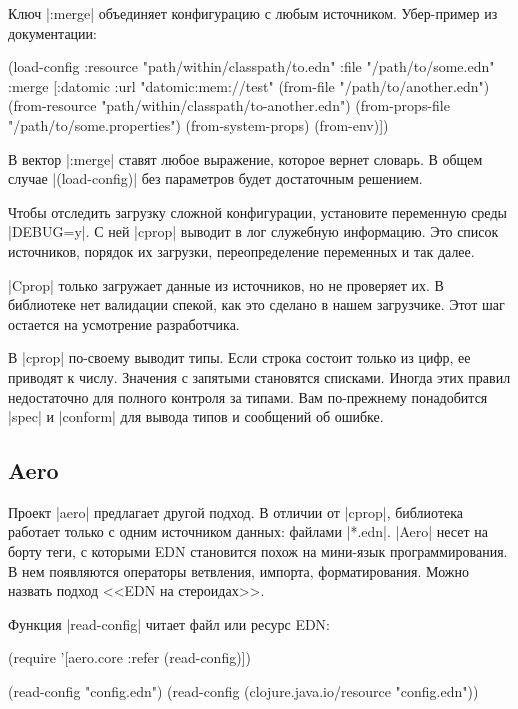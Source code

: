 Ключ \spverb|:merge| объединяет конфигурацию с любым источником. Убер-пример из
документации:

\begin{english}
  \begin{clojure}
(load-config
 :resource "path/within/classpath/to.edn"
 :file "/path/to/some.edn"
 :merge [{:datomic {:url "datomic:mem://test"}}
         (from-file "/path/to/another.edn")
         (from-resource "path/within/classpath/to-another.edn")
         (from-props-file "/path/to/some.properties")
         (from-system-props)
         (from-env)])
  \end{clojure}
\end{english}

В вектор \spverb|:merge| ставят любое выражение, которое вернет словарь. В общем
случае \spverb|(load-config)| без параметров будет достаточным решением.

Чтобы отследить загрузку сложной конфигурации, установите переменную среды
\spverb|DEBUG=y|. С ней \spverb|cprop| выводит в лог служебную информацию. Это
список источников, порядок их загрузки, переопределение переменных и так далее.

\spverb|Cprop| только загружает данные из источников, но не проверяет их. В
библиотеке нет валидации спекой, как это сделано в нашем загрузчике. Этот шаг
остается на усмотрение разработчика.

В \spverb|cprop| по-своему выводит типы. Если строка состоит только из цифр, ее
приводят к числу. Значения с запятыми становятся списками. Иногда этих правил
недостаточно для полного контроля за типами. Вам по-прежнему понадобится
\spverb|spec| и \spverb|conform| для вывода типов и сообщений об ошибке.

\subsection{Aero}

Проект \spverb|aero| предлагает другой
подход. В отличии от \spverb|cprop|, библиотека работает только с одним
источником данных: файлами \spverb|*.edn|. \spverb|Aero| несет на борту теги, с
которыми EDN становится похож на мини-язык программирования. В нем появляются
операторы ветвления, импорта, форматирования. Можно назвать подход <<EDN на
стероидах>>.

Функция \spverb|read-config| читает файл или ресурс EDN:

\begin{english}
  \begin{clojure}
(require '[aero.core :refer (read-config)])

(read-config "config.edn")
(read-config (clojure.java.io/resource "config.edn"))
  \end{clojure}
\end{english}

